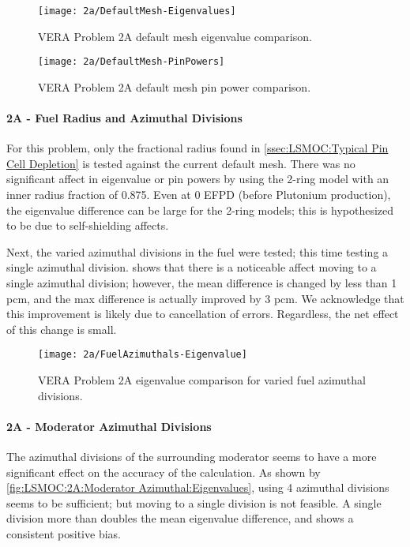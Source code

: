 {{{{{          \begin{figure}
            \centering
            \texttt{[image: 2a/DefaultMesh-Eigenvalues]}
            \caption{VERA Problem 2A default mesh eigenvalue comparison. \label{fig:LSMOC:2A:Default Mesh:Eigenvalues}}
          \end{figure}
          \begin{figure}
            \centering
            \texttt{[image: 2a/DefaultMesh-PinPowers]}
            \caption{VERA Problem 2A default mesh pin power comparison. \label{fig:LSMOC:2A:Default Mesh:PinPowers}}
          \end{figure}
        }
        \paragraph{2A - Fuel Radius and Azimuthal Divisions}{
          For this problem, only the fractional radius found in \cref{ssec:LSMOC:Typical Pin Cell Depletion} is tested against the current default mesh.
          There was no significant affect in eigenvalue or pin powers by using the 2-ring model with an inner radius fraction of 0.875.
          Even at 0 \ac{EFPD} (before Plutonium production), the eigenvalue difference can be large for the 2-ring models; this is hypothesized to be due to self-shielding affects.

          Next, the varied azimuthal divisions in the fuel were tested; this time testing a single azimuthal division.
           shows that there is a noticeable affect moving to a single azimuthal division;
            however, the mean difference is changed by less than 1 \ac{pcm}, and the max difference is actually improved by 3 \ac{pcm}.
          We acknowledge that this improvement is likely due to cancellation of errors. Regardless, the net effect of this change is small.

          \begin{figure}
            \centering
            \texttt{[image: 2a/FuelAzimuthals-Eigenvalue]}
            \caption{VERA Problem 2A eigenvalue comparison for varied fuel azimuthal divisions. \label{fig:LSMOC:2A:Fuel Azimuthals:Eigenvalues}}
          \end{figure}
        }
        \paragraph{2A - Moderator Azimuthal Divisions}{
          The azimuthal divisions of the surrounding moderator seems to have a more significant effect on the accuracy of the calculation.
          As shown by \cref{fig:LSMOC:2A:Moderator Azimuthal:Eigenvalues}, using 4 azimuthal divisions seems to be sufficient; but moving to a single division is not feasible.
          A single division more than doubles the mean eigenvalue difference, and shows a consistent positive bias.

}}}}}
